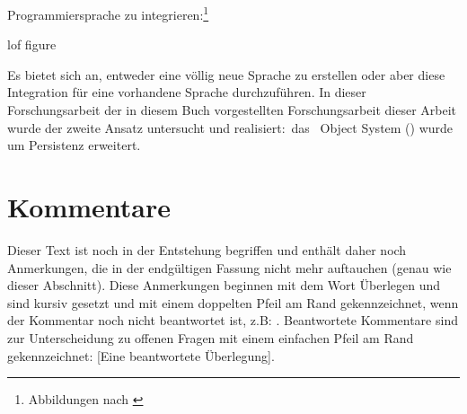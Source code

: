 Programmiersprache zu integrieren:\footnote{Abbildungen nach
\cite[]{bib:at89}} %
%
\begin{figure}[htbp]%
\ifbuch%
\centerline{}%
\else%
\centerline{}%
\fi%
\end{figure}%
%
\addcontentsline%
 {lof}%
 {figure}%
 {\protect{}}%
%
\par\noindent{}Es bietet sich an, entweder eine v\"{o}llig neue Sprache
zu erstellen oder aber diese Integration f\"{u}r eine vorhandene
Sprache durchzuf\"{u}hren. In \ifbericht dieser Forschungsarbeit
\else\ifbuch der in diesem Buch vorgestellten Forschungsarbeit \else
dieser Arbeit \fi\fi wurde der zweite Ansatz untersucht und
realisiert:\ das \cl\ Object System (\clos) wurde um Persistenz
erweitert.
%
\iffalse
Persistente Objekte sind quasi die Vorstufe einer
Datenbank f\"{u}r Objekte. Durch Bereitstellung von Methoden, die eine
datenbank-typische Verwaltung von persistenten Objekten durchf\"{u}hren,
l\"{a}\ss{}t sich ein System, das persistente Objekte anbietet, sehr leicht
in eine objektorientierte Datenbank erweitern
\cite[\citepage{88}]{bib:at89}.
\fi
%
\ifdothink%
\section*{Kommentare}
Dieser Text ist noch in der Entstehung begriffen und enth\"{a}lt daher
noch Anmerkungen, die in der endg\"{u}ltigen Fassung nicht mehr
auftauchen (genau wie dieser Abschnitt).  Diese Anmerkungen beginnen
mit dem Wort \rglq{}\"{U}berlegen\rgrq{} und sind kursiv gesetzt und mit
einem doppelten Pfeil am Rand gekennzeichnet, wenn der Kommentar noch
nicht beantwortet ist, z.B: . Beantwortete Kommentare sind zur
Unterscheidung zu \rglq{}offenen\rgrq{} Fragen mit einem einfachen Pfeil
am Rand gekennzeichnet:
[Eine
beantwortete \"{U}berlegung].%
\fi%
%
